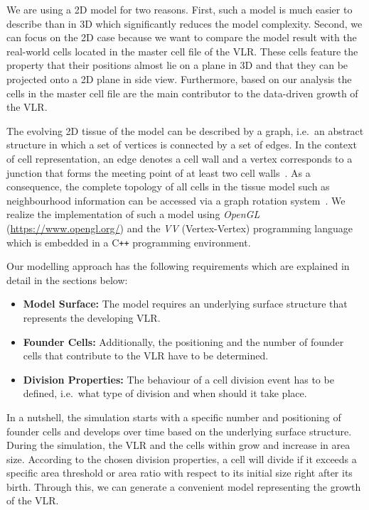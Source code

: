 \documentclass[11pt,a4paper, draft]{article}
\newenvironment{Itemize}{
  \begin{itemize}[leftmargin=0.5cm]{
}}{\end{itemize}}
\begin{document}
We are using a 2D model for two reasons. First, such a model is much easier to describe than in 3D which significantly reduces the model complexity. Second, we can focus on the 2D case because we want to compare the model result with the real-world cells located in the master cell file of the VLR. These cells feature the property that their positions almost lie on a plane in 3D and that they can be projected onto a 2D plane in side view. Furthermore, based on our analysis the cells in the master cell file are the main contributor to the data-driven growth of the VLR.

The evolving 2D tissue of the model can be described by a graph, i.e.~an abstract structure in which a set of vertices is connected by a set of edges. In the context of cell representation, an edge denotes a cell wall and a vertex corresponds to a junction that forms the meeting point of at least two cell walls~\cite{prusinkiewicz_lindenmayer_1990, prusinkiewicz_runions_2012}. As a consequence, the complete topology of all cells in the tissue model such as neighbourhood information can be accessed via a graph rotation system~\cite{edmonds_1960}. We realize the implementation of such a model using \textit{OpenGL} (\href{https://www.opengl.org/}{https://www.opengl.org/}) and the \textit{VV} (Vertex-Vertex) programming language~\cite{smith_et_al_2004, smith_2006} which is embedded in a C{}\verb!++! programming environment.

\noindent
Our modelling approach has the following requirements which are explained in detail in the sections below:
\begin{Itemize}
\item \textbf{Model Surface:} The model requires an underlying surface structure that represents the developing VLR.
\item \textbf{Founder Cells:} Additionally, the positioning and the number of founder cells that contribute to the VLR have to be determined.
\item \textbf{Division Properties:} The behaviour of a cell division event has to be defined, i.e.~what type of division and when should it take place.
\end{Itemize}

In a nutshell, the simulation starts with a specific number and positioning of founder cells and develops over time based on the underlying surface structure. During the simulation, the VLR and the cells within grow and increase in area size. According to the chosen division properties, a cell will divide if it exceeds a specific area threshold or area ratio with respect to its initial size right after its birth. Through this, we can generate a convenient model representing the growth of the VLR.
\end{document}
